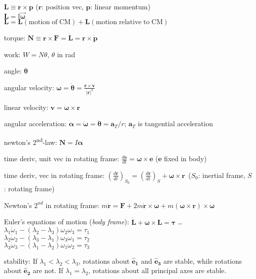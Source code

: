 \documentclass[letterpaper,landscape,10pt]{article}
\newenvironment{mydescription}
{\begin{description}
	\setlength{\itemsep}{0pt}
	\setlength{\parskip}{0pt}
	\setlength{\parsep}{-1pt}}
{\end{description}}
\begin{document}
{\begin{multicols}{3}
\begin{mydescription}
			  $\bm{L}\equiv \bm{r} \times \bm{p}$ ($\bm{r}$: position vec, $\bm{p}$: linear momentum)   \\
			  $\bm{L} = \mathbb{I}\vec{\bm{\omega}}$ \\
			  $\bm{L} = \bm{L}\mathrm{(motion\;of\;CM)}+\bm{L}\mathrm{(motion\;relative\;to\;CM)}$
			\item[torque:]
				$\bm{N}\equiv \bm{r}\times \bm{F} = \dot{\bm{L}} =
				\bm{r}\times\dot{\bm{p}}$  \\
			\item[work:]
				$W = N \theta$, $\theta$ in rad \\
			\item[angle:]
				$\bm{\theta}$  \\
			\item[angular velocity:]
				$\bm{\omega} =
				\dot{\bm{\theta}} =
					\frac{\bm{r}\times \bm{v}}{|\bm{r}|^2}$\\
			\item[linear velocity:]
				$\bm{v}=\bm{\omega}\times \bm{r}$ \\
			\item[angular acceleration:]
				$\bm{\alpha} =
					\dot{\bm{\omega}} = \ddot{\bm{\theta}} = \bm{a}_T/r$;
					$\bm{a}_T$ is tangential acceleration  \\
			\item[newton's 2\textsuperscript{nd}-law:]
					$\bm{N} = I\bm{\alpha}$
			\item[time deriv, unit vec in rotating frame:]
			  $\frac{d\bm{e}}{dt}=\bm{\omega}\times\bm{e}$ ($\bm{e}$ fixed in
			  body)
			\item[time deriv, vec in rotating frame:]$\left( \frac{d\bm{r}}{dt}
			  \right)_{S_0} = \left( \frac{d\bm{r}}{dt} \right)_{S} +
			  \bm{\omega} \times \bm{r}\,$ ($S_0$: inertial frame, $S$: rotating frame)
			\item[Newton's $2^{nd}$ in rotating frame:] $m\ddot{\bm{r}} =
			  \bm{F}+2m\dot{\bm{r}}\times\bm{\omega}+m\left(
			  \bm{\omega\times\bm{r}} \right)\times\bm{\omega}$
			\item[Euler's equations of motion (\emph{body frame}):]
			  $\dot{\bm{L}}+\bm{\omega}\times\bm{L}=\bm\tau$ \dots \\
			  $ \lambda_1\dot\omega_1-\left( \lambda_2-\lambda_3 \right)\omega_2\omega_3 = \tau_1 $ \\
			  $ \lambda_2\dot\omega_2-\left( \lambda_3-\lambda_1 \right)\omega_3\omega_1 = \tau_2 $ \\
			  $ \lambda_3\dot\omega_3-\left( \lambda_1-\lambda_2 \right)\omega_1\omega_2 = \tau_3 $
			\item[stability:] If $\lambda_1<\lambda_2<\lambda_3$, rotations
			  about $\bm{\hat{e}_1}$ and $\bm{\hat{e}_3}$ are stable, while
			  rotations about  $\bm{\hat{e}_2}$ are not. If
			  $\lambda_1=\lambda_2$, rotations about all principal axes are
			  stable.
		\end{mydescription}


\end{multicols}}
\end{document}
